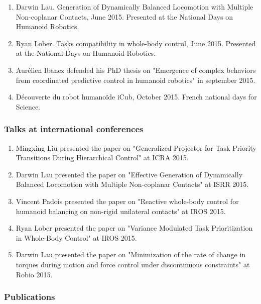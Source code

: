\begin{enumerate}

\item  Darwin Lau. Generation of Dynamically Balanced Locomotion with Multiple Non-coplanar Contacts, June 2015. Presented at the National Days on Humanoid Robotics.

\item Ryan Lober. Tasks compatibility in whole-body control, June 2015. Presented at the National Days on Humanoid Robotics.

\item Aurélien Ibanez defended his PhD thesis on "Emergence of complex behaviors from coordinated predictive control in humanoid robotics" in september 2015.

\item Découverte du robot humanoïde iCub, October 2015. French national days for Science.

\end{enumerate}

\subsubsection{Talks at international conferences}

\begin{enumerate}
\item  Mingxing Liu presented the paper on "Generalized Projector for Task Priority Transitions During Hierarchical Control" at ICRA 2015.

\item Darwin Lau presented the paper on "Effective Generation of Dynamically Balanced Locomotion with Multiple Non-coplanar Contacts" at ISRR 2015.

\item Vincent Padois presented the paper on "Reactive whole-body control for humanoid balancing on non-rigid unilateral contacts" at IROS 2015.

\item Ryan Lober presented the paper on "Variance Modulated Task Prioritization in Whole-Body Control" at IROS 2015.

\item Darwin Lau presented the paper on "Minimization of the rate of change in torques during motion and force control under discontinuous constraints" at Robio 2015.
\end{enumerate}


\subsubsection{Publications}

